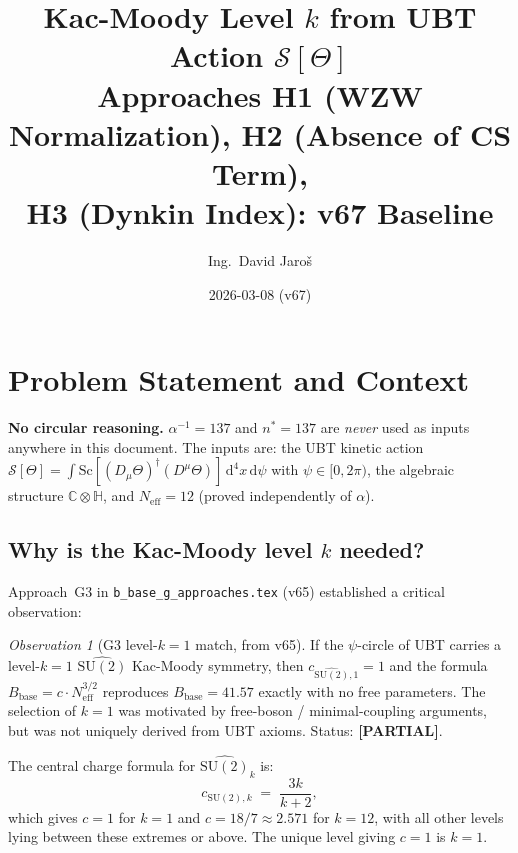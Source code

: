 \documentclass[11pt,a4paper]{article}
\title{Kac-Moody Level $k$ from UBT Action $\mathcal{S}[\Theta]$\\
    \large Approaches H1 (WZW Normalization), H2 (Absence of CS Term),\\
    H3 (Dynkin Index): v67 Baseline}
\author{Ing.\ David Jaroš}
\date{2026-03-08 (v67)}
\theoremstyle{definition}
\theoremstyle{remark}
\newtheorem{observation}{Observation}
\begin{document}
  \maketitle
\fi

\section{Problem Statement and Context}
\label{sec:intro}

\noindent\textbf{No circular reasoning.}
$\alpha^{-1} = 137$ and $n^* = 137$ are \emph{never} used as inputs
anywhere in this document.
The inputs are: the UBT kinetic action
$\mathcal{S}[\Theta] = \int \mathrm{Sc}[(D_\mu\Theta)^\dagger(D^\mu\Theta)]\,\mathrm{d}^4x\,\mathrm{d}\psi$
with $\psi \in [0, 2\pi)$, the algebraic structure $\mathbb{C}\otimes\mathbb{H}$,
and $N_{\mathrm{eff}} = 12$ (proved independently of $\alpha$).

\subsection{Why is the Kac-Moody level $k$ needed?}

Approach~G3 in \texttt{b\_base\_g\_approaches.tex} (v65) established a
critical observation:

\begin{observation}[G3 level-$k=1$ match, from v65]
  \label{obs:G3_k1_recap}
  If the $\psi$-circle of UBT carries a level-$k=1$
  $\widehat{\mathrm{SU}(2)}$ Kac-Moody symmetry, then
  $c_{\widehat{\mathrm{SU}(2)},1} = 1$ and the formula
  $B_{\mathrm{base}} = c \cdot N_{\mathrm{eff}}^{3/2}$ reproduces
  $B_{\mathrm{base}} = 41.57$ exactly with no free parameters.
  The selection of $k = 1$ was motivated by free-boson / minimal-coupling
  arguments, but was not uniquely derived from UBT axioms.
  Status: \textbf{[PARTIAL]}.
\end{observation}

The central charge formula for $\widehat{\mathrm{SU}(2)}_k$ is:
\begin{equation}
  c_{\mathrm{SU}(2),k}
  \;=\; \frac{3k}{k+2},
  \label{eq:c_su2_k}
\end{equation}
which gives $c = 1$ for $k = 1$ and $c = 18/7 \approx 2.571$ for
$k = 12$, with all other levels lying between these extremes or above.
The unique level giving $c = 1$ is $k = 1$.
\end{document}
